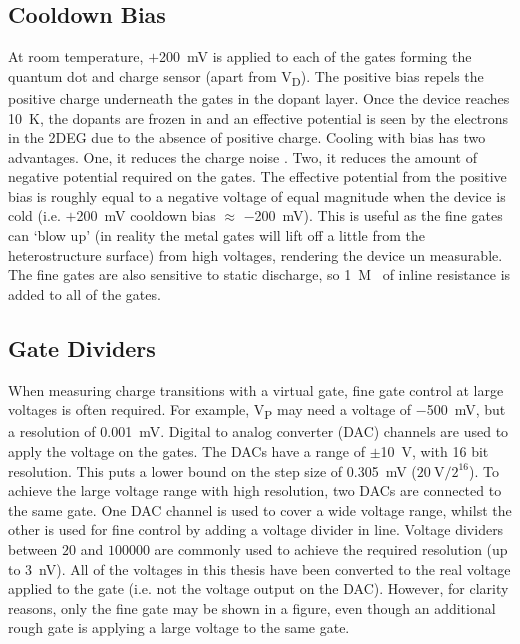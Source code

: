 \subsection{Cooldown Bias}
At room temperature, $+$\qty{200}{mV} is applied to each of the gates forming the quantum dot and charge sensor (apart from V\textsubscript{D}). The positive bias repels the positive charge underneath the gates in the dopant layer. Once the device reaches \qty{10}{K}, the dopants are frozen in and an effective potential is seen by the electrons in the 2DEG due to the absence of positive charge. Cooling with bias has two advantages. One, it reduces the charge noise \cite{bias_cooling}. Two, it reduces the amount of negative potential required on the gates. The effective potential from the positive bias is roughly equal to a negative voltage of equal magnitude when the device is cold (i.e. $+$\qty{200}{mV} cooldown bias $\approx$ $-$\qty{200}{mV}). This is useful as the fine gates can `blow up' (in reality the metal gates will lift off a little from the heterostructure surface) from high voltages, rendering the device un measurable. The fine gates are also sensitive to static discharge, so \qty{1}{M\Omega} of inline resistance is added to all of the gates.  

\subsection{Gate Dividers}
When measuring charge transitions with a virtual gate, fine gate control at large voltages is often required. For example, V\textsubscript{P} may need a voltage of $-$\qty{500}{mV}, but a resolution of \qty{0.001}{mV}. Digital to analog converter (DAC) channels are used to apply the voltage on the gates. The DACs have a range of $\pm$\qty{10}{V}, with 16 bit resolution. This puts a lower bound on the step size of \qty{0.305}{mV} ($\mathrm{\qty{20}{V}/2^{16}}$). To achieve the large voltage range with high resolution, two DACs are connected to the same gate. One DAC channel is used to cover a wide voltage range, whilst the other is used for fine control by adding a voltage divider in line. Voltage dividers between $20$ and $100000$ are commonly used to achieve the required resolution (up to \qty{3}{nV}). All of the voltages in this thesis have been converted to the real voltage applied to the gate (i.e. not the voltage output on the DAC). However, for clarity reasons, only the fine gate may be shown in a figure, even though an additional rough gate is applying a large voltage to the same gate. 













